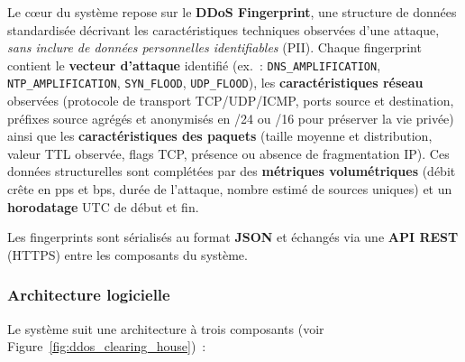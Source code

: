 Le c\oe{}ur du système repose sur le \textbf{DDoS Fingerprint}, une structure de données standardisée décrivant les caractéristiques techniques observées d'une attaque, \textit{sans inclure de données personnelles identifiables} (PII). Chaque fingerprint contient le \textbf{vecteur d'attaque} identifié (ex.~: \texttt{DNS\_AMPLIFICATION}, \texttt{NTP\_AMPLIFICATION}, \texttt{SYN\_FLOOD}, \texttt{UDP\_FLOOD}), les \textbf{caractéristiques réseau} observées (protocole de transport TCP/UDP/ICMP, ports source et destination, préfixes source agrégés et anonymisés en /24 ou /16 pour préserver la vie privée) ainsi que les \textbf{caractéristiques des paquets} (taille moyenne et distribution, valeur TTL observée, flags TCP, présence ou absence de fragmentation IP). Ces données structurelles sont complétées par des \textbf{métriques volumétriques} (débit crête en pps et bps, durée de l'attaque, nombre estimé de sources uniques) et un \textbf{horodatage} UTC de début et fin.

Les fingerprints sont sérialisés au format \textbf{JSON} et échangés via une \textbf{API REST} (HTTPS) entre les composants du système.

\subsubsection{Architecture logicielle}

Le système suit une architecture à trois composants (voir Figure~\ref{fig:ddos_clearing_house})~:

